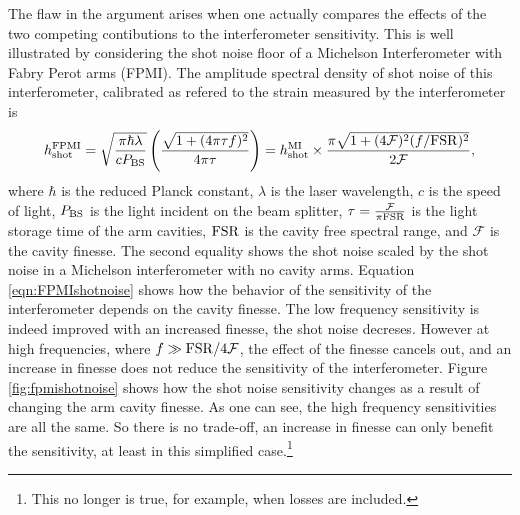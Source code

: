 The flaw in the argument arises when one actually compares the effects of the two competing contibutions to the interferometer sensitivity. %
This is well illustrated by considering the shot noise floor of a Michelson Interferometer with Fabry Perot arms (FPMI). %
The amplitude spectral density of shot noise of this interferometer, calibrated as refered to the strain measured by the interferometer is \cite{LIGO}
\begin{equation}
\label{eqn:FPMIshotnoise}
h_{\rm{shot}}^{\rm{FPMI}}=\sqrt{\frac{\pi \hbar \lambda}{c P_{\rm{BS}}}}\left(\frac{\sqrt{1+(4 \pi\tau f)^2}}{4 \pi \tau }\right)=h_{\rm{shot}}^{\rm{MI}}\times \frac{\pi\sqrt{1+(4\mathcal{F})^2(f/\rm{FSR})^2}}{2 \mathcal{F}},
\end{equation}
where $\hbar$ is the reduced Planck constant, $\lambda$ is the laser wavelength, $c$ is the speed of light, $P_{\rm{BS}}$ is the light incident on the beam splitter, $\tau=\frac{\mathcal{F}}{\pi \rm{FSR}}$ is the light storage time of the arm cavities, $\rm{FSR}$ is the cavity free spectral range, and $\mathcal{F}$ is the cavity finesse. %
The second equality shows the shot noise scaled by the shot noise in a Michelson interferometer with no cavity arms. %
Equation \ref{eqn:FPMIshotnoise} shows how the behavior of the sensitivity of the interferometer depends on the cavity finesse. %
The low frequency sensitivity is indeed improved with an increased finesse, the shot noise decreses. %
However at high frequencies, where $f \gg \rm{FSR}/4\mathcal{F}$, the effect of the finesse cancels out, and an increase in finesse does not reduce the sensitivity of the interferometer. %
Figure \ref{fig:fpmishotnoise} shows how the shot noise sensitivity changes as a result of changing the arm cavity finesse. %
As one can see, the high frequency sensitivities are all the same. %
So there is no trade-off, an increase in finesse can only benefit the sensitivity, at least in this simplified case.\footnote{This no longer is true, for example, when losses are included.}

